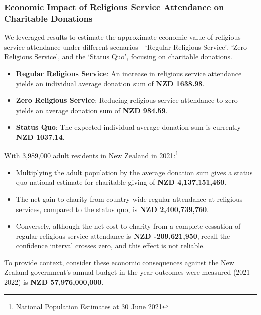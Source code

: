 \documentclass[
  single column]{article}
\providecommand{\tightlist}{%
  \setlength{\itemsep}{0pt}\setlength{\parskip}{0pt}}\usepackage{longtable,booktabs,array}
\begin{document}
\subsubsection{Economic Impact of Religious Service Attendance on
Charitable
Donations}\label{economic-impact-of-religious-service-attendance-on-charitable-donations}

We leveraged results to estimate the approximate economic value of
religious service attendance under different scenarios---`Regular
Religious Service', `Zero Religious Service', and the `Status Quo',
focusing on charitable donations.

\begin{itemize}
\tightlist
\item
  \textbf{Regular Religious Service}: An increase in religious service
  attendance yields an individual average donation sum of \textbf{NZD
  1638.98}.
\item
  \textbf{Zero Religious Service}: Reducing religious service attendance
  to zero yields an average donation sum of \textbf{NZD 984.59}.
\item
  \textbf{Status Quo}: The expected individual average donation sum is
  currently \textbf{NZD 1037.14}.
\end{itemize}

With 3,989,000 adult residents in New Zealand in 2021:\footnote{\href{https://www.stats.govt.nz/information-releases/national-population-estimates-at-30-june-2021}{National
  Population Estimates at 30 June 2021}}

\begin{itemize}
\tightlist
\item
  Multiplying the adult population by the average donation sum gives a
  status quo national estimate for charitable giving of \textbf{NZD
  4,137,151,460}.
\item
  The net gain to charity from country-wide regular attendance at
  religious services, compared to the status quo, is \textbf{NZD
  2,400,739,760}.
\item
  Conversely, although the net cost to charity from a complete cessation
  of regular religious service attendance is \textbf{NZD -209,621,950},
  recall the confidence interval crosses zero, and this effect is not
  reliable.
\end{itemize}

To provide context, consider these economic consequences against the New
Zealand government's annual budget in the year outcomes were measured
(2021-2022) is \textbf{NZD 57,976,000,000}.
\end{document}
